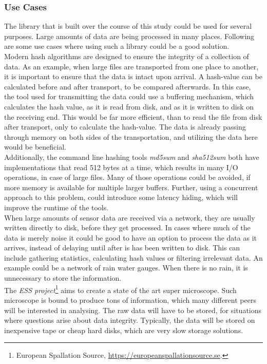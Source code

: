 \documentclass[a4paper]{article}
\begin{document}
\subsubsection{Use Cases}
The library that is built over the course of this study could be used for several purposes. Large amounts of data are being processed in many places. Following are some use cases where using such a library could be a good solution.\\

Modern hash algorithms are designed to ensure the integrity of a collection of data. As an example, when large files are transported from one place to another, it is important to ensure that the data is intact upon arrival. A hash-value can be calculated before and after transport, to be compared afterwards. In this case, the tool used for transmitting the data could use a buffering mechanism, which calculates the hash value, as it is read from disk, and as it is written to disk on the receiving end. This would be far more efficient, than to read the file from disk after transport, only to calculate the hash-value. The data is already passing through memory on both sides of the transportation, and utilizing the data here would be beneficial.\\

Additionally, the command line hashing tools \textit{md5sum} and \textit{sha512sum} both have implementations that read 512 bytes at a time, which results in many I/O operations, in case of large files. Many of those operations could be avoided, if more memory is available for multiple larger buffers. Further, using a concurrent approach to this problem, could introduce some latency hiding, which will improve the runtime of the tools.\\

When large amounts of sensor data are received via a network, they are usually written directly to disk, before they get processed. In cases where much of the data is merely noise it could be good to have an option to process the data as it arrives, instead of delaying until after is has been written to disk. This can include gathering statistics, calculating hash values or filtering irrelevant data. An example could be a network of rain water gauges. When there is no rain, it is unnecessary to store the information.\\

The \textit{ESS project}\footnote{European Spallation Source, \url{https://europeanspallationsource.se}.}  aims to create a state of the art super microscope. Such microscope is bound to produce tons of information, which many different peers will be interested in analysing. The raw data will have to be stored, for situations where questions arise about data integrity. Typically, the data will be stored on inexpensive tape or cheap hard disks, which are very slow storage solutions. 
\end{document}
